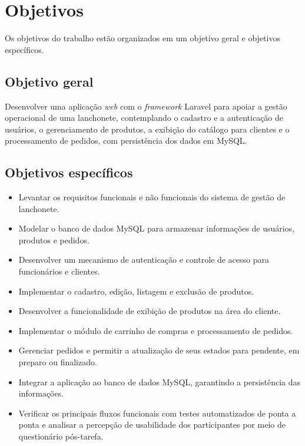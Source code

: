 \section{Objetivos}

Os objetivos do trabalho estão organizados em um objetivo geral e objetivos específicos.

\subsection{Objetivo geral}
Desenvolver uma aplicação \textit{web} com o \textit{framework} Laravel para apoiar a gestão operacional de uma lanchonete, contemplando o cadastro e a autenticação de usuários, o gerenciamento de produtos, a exibição do catálogo para clientes e o processamento de pedidos, com persistência dos dados em MySQL.

\subsection{Objetivos específicos}

\begin{itemize}
    \item Levantar os requisitos funcionais e não funcionais do sistema de gestão de lanchonete.
    \item Modelar o banco de dados MySQL para armazenar informações de usuários, produtos e pedidos.
    \item Desenvolver um mecanismo de autenticação e controle de acesso para funcionários e clientes.
    \item Implementar o cadastro, edição, listagem e exclusão de produtos.
    \item Desenvolver a funcionalidade de exibição de produtos na área do cliente.
    \item Implementar o módulo de carrinho de compras e processamento de pedidos.
    \item Gerenciar pedidos e permitir a atualização de seus estados para pendente, em preparo ou finalizado.
    \item Integrar a aplicação ao banco de dados MySQL, garantindo a persistência das informações.
    \item Verificar os principais fluxos funcionais com testes automatizados de ponta a ponta e analisar a percepção de usabilidade dos participantes por meio de questionário pós-tarefa.
\end{itemize}
